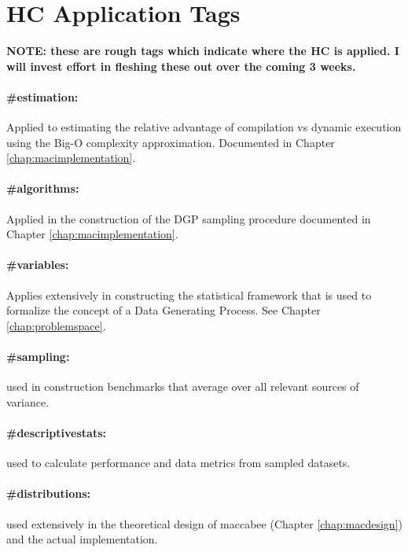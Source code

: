 \documentclass[./main.tex]{subfiles}
\begin{document}
\section{HC Application Tags}

\textbf{NOTE: these are rough tags which indicate where the HC is applied. I will invest effort in fleshing these out over the coming 3 weeks.}

\paragraph*{\textbf{\#estimation:}}\label{hc:estimation} Applied to estimating the relative advantage of compilation vs dynamic execution using the Big-O complexity approximation. Documented in Chapter \ref{chap:macimplementation}.

\paragraph*{\textbf{\#algorithms:}}\label{hc:algorithms} Applied in the construction of the DGP sampling procedure documented in Chapter \ref{chap:macimplementation}.

\paragraph*{\textbf{\#variables:}}\label{hc:variables} Applies extensively in constructing the statistical framework that is used to formalize the concept of a Data Generating Process. See Chapter \ref{chap:problemspace}.

\paragraph*{\textbf{\#sampling:}}\label{hc:sampling} used in construction benchmarks that average over all relevant sources of variance.

\paragraph*{\textbf{\#descriptivestats:}}\label{hc:descriptivestats} used to calculate performance and data metrics from sampled datasets.

\paragraph*{\textbf{\#distributions:}}\label{hc:distributions} used extensively in the theoretical design of maccabee (Chapter \ref{chap:macdesign}) and the actual implementation.
\end{document}
